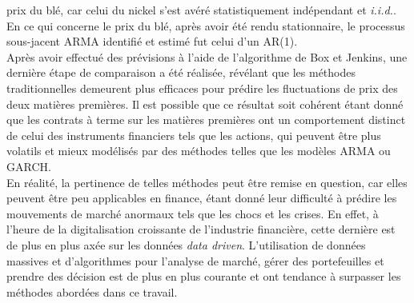 prix du blé, car celui du nickel s'est avéré statistiquement indépendant et \textit{i.i.d.}. En ce qui concerne le prix du blé, après avoir été rendu stationnaire, le 
processus sous-jacent ARMA identifié et estimé fut celui d'un AR(1). \\[11pt]
Après avoir effectué des prévisions à l'aide de l'algorithme de Box et Jenkins, une dernière étape de comparaison a été réalisée, révélant que les méthodes traditionnelles 
demeurent plus efficaces pour prédire les fluctuations de prix des deux matières premières. Il est possible que ce résultat soit cohérent étant donné que les contrats à 
terme sur les matières premières ont un comportement distinct de celui des instruments financiers tels que les actions, qui peuvent être plus volatils et mieux modélisés 
par des méthodes telles que les modèles ARMA ou GARCH.\\[11pt]
En réalité, la pertinence de telles méthodes peut être remise en question, car elles peuvent être peu applicables en finance, étant donné leur difficulté à prédire les mouvements de marché anormaux tels que les chocs et les crises. En effet, à l'heure de la digitalisation croissante de l'industrie financière, cette dernière est de plus en plus axée sur les données \textit{data driven}. L'utilisation de données massives et d'algorithmes pour l'analyse de marché, gérer des portefeuilles et prendre des décision est de plus en plus courante et ont tendance à surpasser les méthodes abordées dans ce travail.